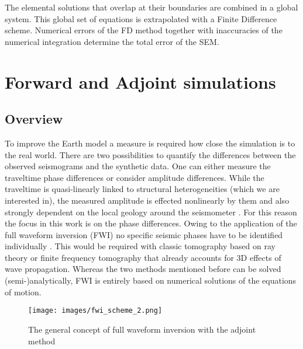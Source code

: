 The elemental solutions that overlap at their boundaries are combined in a global system. 
This global set of equations is extrapolated with a Finite Difference scheme.
Numerical errors of the FD method together with inaccuracies of the numerical integration determine the total error of the SEM.



\section{Forward and Adjoint simulations}


\subsection{Overview}
To improve the Earth model a measure is required how close the simulation is to the real world. 
There are two possibilities to quantify the differences between the observed seismograms and the synthetic data.
One can either measure the traveltime phase differences or consider amplitude differences.
While the traveltime is quasi-linearly linked to structural heterogeneities (which we are interested in),
the measured amplitude is effected nonlinearly by them and also strongly dependent on the local geology 
around the seismometer \citep{Fichtner2008}.
For this reason the focus in this work is on the phase differences.
Owing to the application of the full waveform inversion (FWI) no specific seismic phases have to be identified 
individually \citep{Fichtner2011a}. 
This would be required with classic tomography based on ray theory or finite frequency tomography that already 
accounts for 3D effects of wave propagation. %
Whereas the two methods mentioned before can be solved (semi-)analytically, FWI is entirely based on numerical
solutions of the equations of motion.

\begin{figure}[h]
\begin{center}
\texttt{[image: images/fwi\_scheme\_2.png]}
\caption{The general concept of full waveform inversion with the adjoint method}
\label{adjoint_scheme}
\end{center}
\end{figure}

